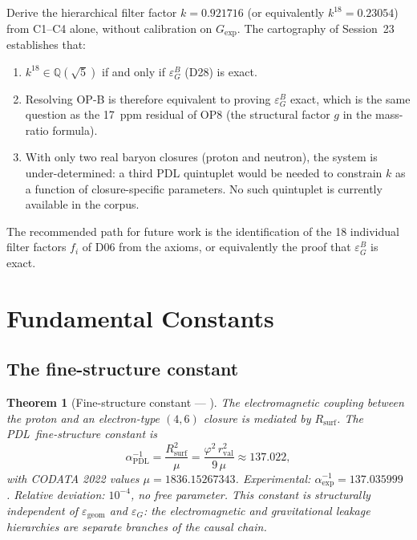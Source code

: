 \documentclass[12pt,a4paper]{article}
\theoremstyle{plain}
\newtheorem{theorem}{Theorem}[section]
\theoremstyle{definition}
\theoremstyle{remark}
\newenvironment{openproblem}[1][]{%
  \begin{tcolorbox}[openproblemstyle,title={Open Problem\ifx\relax#1\relax\else: #1\fi}]}{\end{tcolorbox}}
\newcommand{\PDL}{\textsc{PDL}}
\newcommand{\vp}{\varphi}
\newcommand{\rval}{r_{\mathrm{val}}}
\newcommand{\Rsurf}{R_{\mathrm{surf}}}
\newcommand{\egeom}{\varepsilon_{\mathrm{geom}}}
\newcommand{\eG}{\varepsilon_G}
\newcommand{\eGB}{\varepsilon_G^B}
\begin{document}
\begin{openproblem}[OP-B --- Derivation of $k$ from axioms]
\label{op:B}
Derive the hierarchical filter factor $k=0.921716$ (or equivalently $k^{18}=0.23054$) from C1--C4 alone, without calibration on $G_{\exp}$. The cartography of Session~23 establishes that:
\begin{enumerate}[nosep]
\item $k^{18}\in\mathbb{Q}(\sqrt{5})$ if and only if $\eGB$ (D28) is exact.
\item Resolving OP-B is therefore equivalent to proving $\eGB$ exact, which is the same question as the 17~ppm residual of OP8 (the structural factor $g$ in the mass-ratio formula).
\item With only two real baryon closures (proton and neutron), the system is under-determined: a third PDL quintuplet would be needed to constrain $k$ as a function of closure-specific parameters. No such quintuplet is currently available in the corpus.
\end{enumerate}
The recommended path for future work is the identification of the 18 individual filter factors $f_i$ of D06 from the axioms, or equivalently the proof that $\eGB$ is exact.
\end{openproblem}

\section{Fundamental Constants}
\label{sec:constants}

\subsection{The fine-structure constant}

\begin{theorem}[Fine-structure constant --- \citep{D12,D25}]
\label{thm:alpha}
The electromagnetic coupling between the proton and an electron-type $(4,6)$ closure is mediated by $\Rsurf$. The \PDL\ fine-structure constant is
\[
\alpha_{\mathrm{PDL}}^{-1} = \frac{\Rsurf^2}{\mu} = \frac{\vp^2\,\rval^2}{9\,\mu} \approx 137.022,
\]
with CODATA 2022 values $\mu=1836.15267343$. Experimental: $\alpha_{\exp}^{-1}=137.035999$ \citep{CODATA2022}. Relative deviation: $10^{-4}$, no free parameter. This constant is structurally independent of $\egeom$ and $\eG$: the electromagnetic and gravitational leakage hierarchies are separate branches of the causal chain.
\end{theorem}
\end{document}
